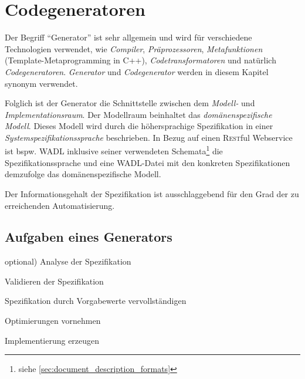 \section{Codegeneratoren}


Der Begriff \enquote{Generator} ist sehr allgemein und wird für verschiedene Technologien verwendet, wie \emph{Compiler}, \emph{Präprozessoren}, \emph{Metafunktionen} (Template-Metaprogramming in C++), \emph{Codetransformatoren} und natürlich \emph{Codegeneratoren}. 
\emph{Generator} und \emph{Codegenerator} werden in diesem Kapitel synonym verwendet.


Folglich ist der Generator die Schnittstelle zwischen dem \emph{Modell-} und \emph{Implementationsraum}. Der Modellraum beinhaltet das \emph{domänenspezifische Modell}. Dieses Modell wird durch die höhersprachige Spezifikation in einer \emph{Systemspezifikationssprache} beschrieben. In Bezug auf einen \textsc{Rest}ful Webservice ist bspw. \gls{WADL} inklusive seiner verwendeten Schemata\footnote{siehe \cref{sec:document_description_formats}} die Spezifikationssprache und eine \gls{WADL}-Datei mit den konkreten Spezifikationen demzufolge das domänenspezifische Modell.

Der Informationsgehalt der Spezifikation ist ausschlaggebend für den Grad der zu erreichenden Automatisierung.

\subsection{Aufgaben eines Generators}
\label{sec:generator_tasks}

\begin{compactenum}
    \item[optional)] Analyse der Spezifikation
    \item Validieren der Spezifikation
    \item Spezifikation durch Vorgabewerte vervollständigen
    \item Optimierungen vornehmen
    \item Implementierung erzeugen
\end{compactenum}

